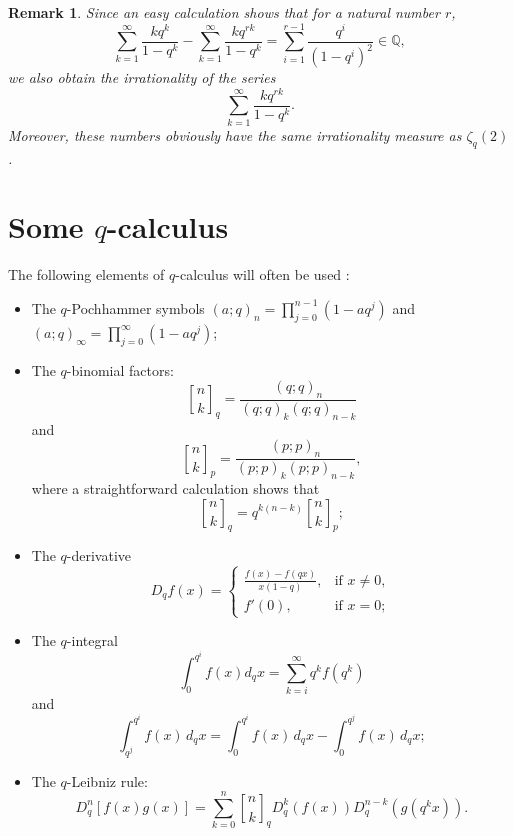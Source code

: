 \documentclass[12pt]{article}
\newtheorem{remark}[theorem]{Remark}
\def \qbinom#1#2{\genfrac{[}{]}{0pt}{}{#1}{#2}}
\numberwithin{equation}{section}
\begin{document}
\begin{remark}\label{oeps}
\rm Since an easy calculation shows that
for a natural number $r$,
\[\sum_{k=1}^\infty \frac{kq^{k}}{1-q^k}-\sum_{k=1}^\infty \frac{kq^{rk}}{1-q^k}
=\sum_{i=1}^{r-1}\frac{q^i}{(1-q^i)^2}\in\mathbb{Q},\]
we also obtain the irrationality of the series
\[   \sum_{k=1}^{\infty}\frac{kq^{rk}}{1-q^k}.\]
Moreover, these numbers obviously have the same irrationality measure as
$\zeta_q(2)$.
\end{remark}

\section{Some $q$-calculus}
The following elements of $q$-calculus will often be used :
\begin{itemize}
    \item The $q$-Pochhammer symbols
    \begin{math}\left(a;q\right)_n=\prod_{j=0}^{n-1}\left(1-aq^j\right)\end{math}
and
    \begin{math}\left(a;q\right)_\infty=\prod_{j=0}^{\infty}\left(1-aq^j\right)\end{math};
    \item The $q$-binomial factors:
\[   \qbinom{n}{k}_q=\frac{\left(q;q\right)_n}{\left(q;q\right)_k\left(q;q\right)_{n-k}} \]
 and
\[  \qbinom{n}{k}_p=\frac{\left(p;p\right)_n}{\left(p;p\right)_k\left(p;p\right)_{n-k}}, \]
where a straightforward calculation shows that
\[   \qbinom{n}{k}_q=q^{k(n-k)} \qbinom{n}{k}_p; \]
    \item The $q$-derivative
\[ D_qf\left(x\right)=\begin{cases}
 \displaystyle \frac{f\left(x\right)-f\left(qx\right)}{x(1-q)}, & \textrm{if }  x\neq 0, \\
                f'(0), & \textrm{if } x=0;
                      \end{cases}  \]
    \item The $q$-integral
\[ \int_0^{q^i}f\left(x\right)d_qx=\sum_{k=i}^\infty
    q^kf(q^{k}) \]
and
\[ \int_{q^j}^{q^i}f(x)\,d_qx=\int_{0}^{q^i}f(x)\,d_qx-\int_{0}^{q^j}f(x)\,d_qx; \]
    \item The $q$-Leibniz rule:
\[  D_q^n[f(x)g(x)]=\sum_{k=0}^n \qbinom{n}{k}_q D_q^k\left(f(x)\right)D_q^{n-k}\left(g(q^kx)\right). \]
\end{itemize}
\end{document}
